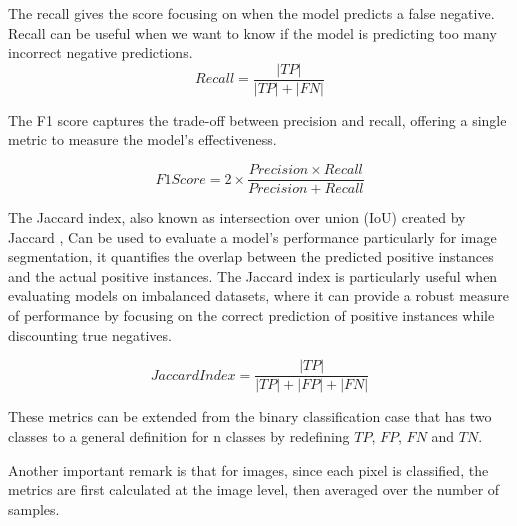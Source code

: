 The recall gives the score focusing on when the model predicts a false negative.
Recall can be useful when we want to know if the model is predicting too many incorrect negative predictions.
\begin{equation}
  Recall = \frac{|TP|}{|TP| + |FN|}
\end{equation}

The F1 score captures the trade-off between precision and recall, offering a single metric to measure the model's effectiveness.

\begin{equation}
  F1Score = 2 \times \frac{Precision \times Recall}{Precision + Recall}
\end{equation}

The Jaccard index, also known as intersection over union (IoU) created by Jaccard \cite{paul},
Can be used to evaluate a model's performance particularly for image segmentation,
it quantifies the overlap between the predicted positive instances and the actual positive instances.
The Jaccard index is particularly useful when evaluating models on imbalanced datasets, where it can provide a robust measure of performance by focusing on the correct prediction of positive instances while discounting true negatives.

\begin{equation}
  Jaccard Index = \frac{|TP|}{|TP| + |FP| + |FN|}
\end{equation}
\medskip

These metrics can be extended from the binary classification case that has two classes to a general definition for n classes by redefining $TP$, $FP$, $FN$ and $TN$.

Another important remark is that for images, since each pixel is classified, the metrics are first calculated at the image level, then averaged over the number of samples.